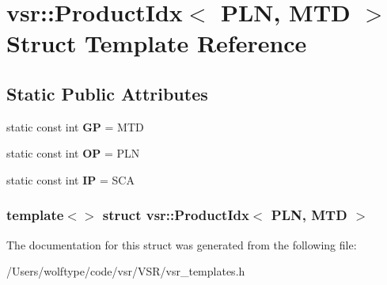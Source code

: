 \hypertarget{structvsr_1_1_product_idx_3_01_p_l_n_00_01_m_t_d_01_4}{\section{vsr\-:\-:Product\-Idx$<$ P\-L\-N, M\-T\-D $>$ Struct Template Reference}
\label{structvsr_1_1_product_idx_3_01_p_l_n_00_01_m_t_d_01_4}
}
\subsection*{Static Public Attributes}
\begin{DoxyCompactItemize}
\item 
\hypertarget{structvsr_1_1_product_idx_3_01_p_l_n_00_01_m_t_d_01_4_a73c77cd0d85d6e5a7363d2bb0dbea72f}{static const int {\bfseries G\-P} = M\-T\-D}\label{structvsr_1_1_product_idx_3_01_p_l_n_00_01_m_t_d_01_4_a73c77cd0d85d6e5a7363d2bb0dbea72f}

\item 
\hypertarget{structvsr_1_1_product_idx_3_01_p_l_n_00_01_m_t_d_01_4_acac07ca6e19acbedee2e35ffa6ab8e9f}{static const int {\bfseries O\-P} = P\-L\-N}\label{structvsr_1_1_product_idx_3_01_p_l_n_00_01_m_t_d_01_4_acac07ca6e19acbedee2e35ffa6ab8e9f}

\item 
\hypertarget{structvsr_1_1_product_idx_3_01_p_l_n_00_01_m_t_d_01_4_ae1c2ab6b4f5432bede27247e1d25660a}{static const int {\bfseries I\-P} = S\-C\-A}\label{structvsr_1_1_product_idx_3_01_p_l_n_00_01_m_t_d_01_4_ae1c2ab6b4f5432bede27247e1d25660a}

\end{DoxyCompactItemize}
\subsubsection*{template$<$$>$ struct vsr\-::\-Product\-Idx$<$ P\-L\-N, M\-T\-D $>$}



The documentation for this struct was generated from the following file\-:\begin{DoxyCompactItemize}
\item 
/\-Users/wolftype/code/vsr/\-V\-S\-R/vsr\-\_\-templates.\-h\end{DoxyCompactItemize}
